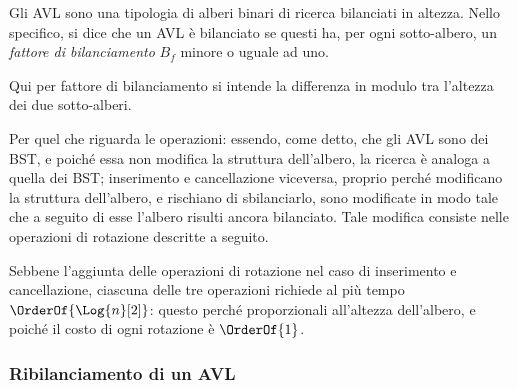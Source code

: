 \documentclass{subfiles}
\begin{document}
Gli AVL sono una tipologia di alberi binari di ricerca bilanciati in altezza.
Nello specifico, si dice che un AVL è bilanciato se questi ha, per ogni sotto-albero, un \emph{fattore di bilanciamento} \(B_{f}\) minore o uguale ad uno.
\begin{MarginNote}
    Qui per fattore di bilanciamento si intende la differenza in modulo tra l'altezza dei due sotto-alberi.
\end{MarginNote}

Per quel che riguarda le operazioni: essendo, come detto, che gli AVL sono dei BST, e poiché essa non modifica la struttura dell'albero,
la ricerca è analoga a quella dei BST; inserimento e cancellazione viceversa, proprio perché modificano la struttura dell'albero,
e rischiano di sbilanciarlo, sono modificate in modo tale che a seguito di esse l'albero risulti ancora bilanciato.
Tale modifica consiste nelle operazioni di rotazione descritte a seguito.

\begin{Remark*}
    Sebbene l'aggiunta delle operazioni di rotazione nel caso di inserimento e cancellazione,
    ciascuna delle tre operazioni richiede al più tempo \(\OrderOf{\Log{n}[2]}\): questo perché proporzionali all'altezza dell'albero,
    e poiché il costo di ogni rotazione è \(\OrderOf{1}\).
\end{Remark*}

\subsubsection{Ribilanciamento di un AVL}

\end{document}
